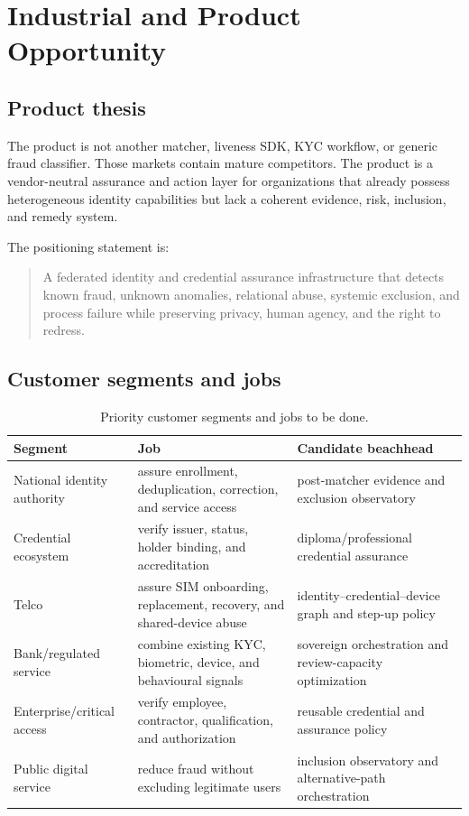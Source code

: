\chapter{Industrial and Product Opportunity}

\section{Product thesis}

The product is not another matcher, liveness SDK, KYC workflow, or generic fraud classifier. Those markets contain mature competitors. The product is a vendor-neutral assurance and action layer for organizations that already possess heterogeneous identity capabilities but lack a coherent evidence, risk, inclusion, and remedy system.

The positioning statement is:

\begin{quote}
A federated identity and credential assurance infrastructure that detects known fraud, unknown anomalies, relational abuse, systemic exclusion, and process failure while preserving privacy, human agency, and the right to redress.
\end{quote}

\section{Customer segments and jobs}

\begin{table}[htbp]
\centering
\caption{Priority customer segments and jobs to be done.}
\begin{tabularx}{\textwidth}{p{35mm}YY}
\toprule
Segment & Job & Candidate beachhead\\
\midrule
National identity authority & assure enrollment, deduplication, correction, and service access & post-matcher evidence and exclusion observatory\\
Credential ecosystem & verify issuer, status, holder binding, and accreditation & diploma/professional credential assurance\\
Telco & assure SIM onboarding, replacement, recovery, and shared-device abuse & identity--credential--device graph and step-up policy\\
Bank/regulated service & combine existing KYC, biometric, device, and behavioural signals & sovereign orchestration and review-capacity optimization\\
Enterprise/critical access & verify employee, contractor, qualification, and authorization & reusable credential and assurance policy\\
Public digital service & reduce fraud without excluding legitimate users & inclusion observatory and alternative-path orchestration\\
\bottomrule
\end{tabularx}
\end{table}

